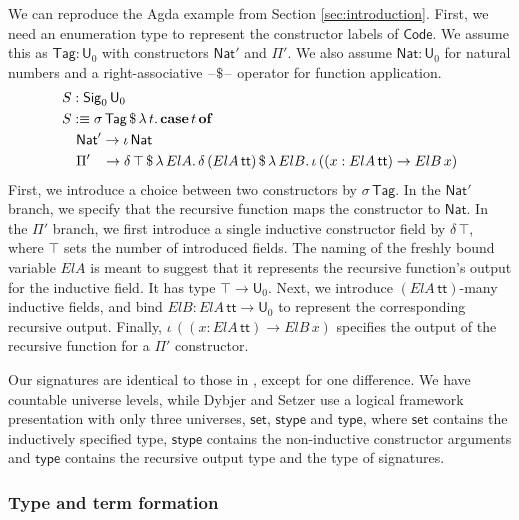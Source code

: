 \documentclass[acmsmall,screen,review,anonymous]{acmart}
\newcommand{\msf}[1]{{\mathsf{#1}}}
\newcommand{\mbf}[1]{{\mathbf{#1}}}
\newcommand{\U}{\msf{U}}
\newcommand{\Nat}{\msf{Nat}}
\newcommand{\Sig}{\msf{Sig}}
\newcommand{\Code}{\msf{Code}}
\newcommand{\Tag}{\msf{Tag}}
\newcommand{\case}{\mbf{case}}
\newcommand{\of}{\mbf{of}}
\newcommand{\ttt}{\msf{tt}}
\newcommand{\blank}{{\mathord{\hspace{1pt}\text{--}\hspace{1pt}}}}
\begin{document}
\begin{example}\label{ex:code-signature}
We can reproduce the Agda example from Section \ref{sec:introduction}. First, we need an enumeration
type to represent the constructor labels of $\Code$. We assume this as $\Tag : \U_0$ with
constructors $\Nat'$ and $\Pi'$. We also assume $\Nat : \U_0$ for natural numbers and a
right-associative $\blank\!\$\!\blank$ operator for function application.
\begin{alignat*}{4}
  & S : \Sig_0\,\U_0\\
  & S :\equiv \sigma\,\Tag\,\$\,\lambda\,t.\,\case\,t\,\of \\
  & \quad \Nat' \to \iota\,\Nat \\
  & \quad \Pi'\hspace{0.85em} \to \delta\,\top\,\$\,\lambda\,{ElA}.\, \delta\,({ElA}\,\ttt)\,\$\,\lambda\,{ElB}.\,
      \iota\, ((x : {ElA}\,\ttt) \to {ElB}\,x)
\end{alignat*}
First, we introduce a choice between two constructors by $\sigma\,\Tag$. In the $\Nat'$ branch, we
specify that the recursive function maps the constructor to $\Nat$. In the $\Pi'$ branch, we first
introduce a single inductive constructor field by $\delta\,\top$, where $\top$ sets the number of
introduced fields. The naming of the freshly bound variable ${ElA}$ is meant to suggest that it
represents the recursive function's output for the inductive field. It has type $\top \to \U_0$.
Next, we introduce $({ElA}\,\ttt)$-many inductive fields, and bind ${ElB} : {ElA}\,\ttt \to \U_0$ to
represent the corresponding recursive output. Finally, $\iota\, ((x : {ElA}\,\ttt) \to {ElB}\,x)$
specifies the output of the recursive function for a $\Pi'$ constructor.
\end{example}

Our signatures are identical to those in \cite{DBLP:journals/apal/DybjerS03}, except for
one difference.  We have countable universe levels, while Dybjer and Setzer use a logical framework
presentation with only three universes, $\msf{set}$, $\msf{stype}$ and $\msf{type}$, where
$\msf{set}$ contains the inductively specified type, $\msf{stype}$ contains the non-inductive
constructor arguments and $\msf{type}$ contains the recursive output type and the type of
signatures.

\subsubsection{Type and term formation}\label{sec:ir-type-and-term-formation}
\end{document}
